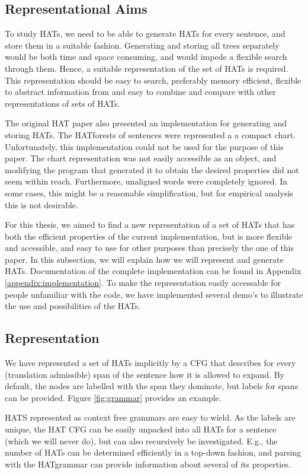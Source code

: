 \subsection{Representational Aims}

To study HATs, we need to be able to generate HATs for every sentence, and store them in a suitable fashion. Generating and storing all trees separately would be both time and space consuming, and would impede a flexible search through them. Hence, a suitable representation of the set of HATs is required. This representation should be easy to search, preferably memory efficient, flexible to abstract information from and easy to combine and compare with other representations of sets of HATs.

The original HAT paper also presented an implementation for generating and storing HATs. The HATforests of sentences were represented a a compact chart. Unfortunately, this implementation could not be used for the purpose of this paper. The chart representation was not easily accessible as an object, and modifying the program that generated it to obtain the desired properties did not seem within reach. Furthermore, unaligned words were completely ignored. In some cases, this might be a reasonable simplification, but for empirical analysis this is not desirable.

For this thesis, we aimed to find a new representation of a set of HATs that has both the efficient properties of the current implementation, but is more flexible and accessible, and easy to use for other purposes than precisely the one of this paper. In this subsection, we will explain how we will represent and generate HATs. Documentation of the complete implementation can be found in Appendix \ref{appendix:implementation}. To make the representation easily accessable for people unfamiliar with the code, we have implemented several demo's to illustrate the use and possibilities of the HATs.


\subsection{Representation}

We have represented a set of HATs implicitly by a CFG that describes for every (translation admissible) span of the sentence how it is allowed to expand. By default, the nodes are labelled with the span they dominate, but labels for spans can be provided. Figure \ref{fig:grammar} provides an example.

HATS represented as context free grammars are easy to wield. As the labels are unique, the HAT CFG can be easily unpacked into all HATs for a sentence (which we will never do), but can also recursively be investigated. E.g., the number of HATs can be determined efficiently in a top-down fashion, and parsing with the HATgrammar can provide information about several of its properties.

